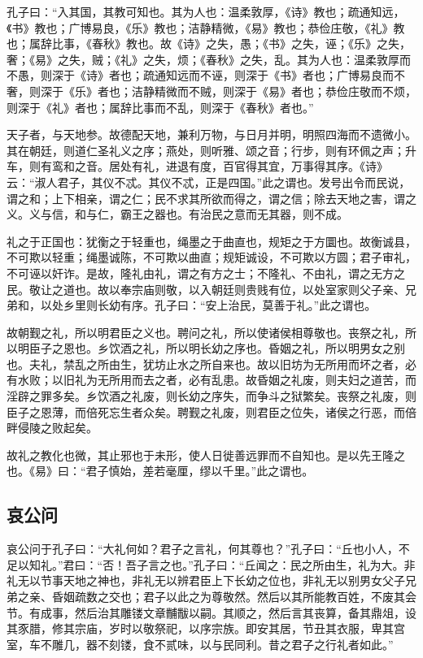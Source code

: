 \documentclass[]{article}
\begin{document}
孔子曰：``入其国，其教可知也。其为人也：温柔敦厚，《诗》教也；疏通知远，《书》教也；广博易良，《乐》教也；洁静精微，《易》教也；恭俭庄敬，《礼》教也；属辞比事，《春秋》教也。故《诗》之失，愚；《书》之失，诬；《乐》之失，奢；《易》之失，贼；《礼》之失，烦；《春秋》之失，乱。其为人也：温柔敦厚而不愚，则深于《诗》者也；疏通知远而不诬，则深于《书》者也；广博易良而不奢，则深于《乐》者也；洁静精微而不贼，则深于《易》者也；恭俭庄敬而不烦，则深于《礼》者也；属辞比事而不乱，则深于《春秋》者也。''

天子者，与天地参。故德配天地，兼利万物，与日月并明，明照四海而不遗微小。其在朝廷，则道仁圣礼义之序；燕处，则听雅、颂之音；行步，则有环佩之声；升车，则有鸾和之音。居处有礼，进退有度，百官得其宜，万事得其序。《诗》云：``淑人君子，其仪不忒。其仪不忒，正是四国。''此之谓也。发号出令而民说，谓之和；上下相亲，谓之仁；民不求其所欲而得之，谓之信；除去天地之害，谓之义。义与信，和与仁，霸王之器也。有治民之意而无其器，则不成。

礼之于正国也：犹衡之于轻重也，绳墨之于曲直也，规矩之于方圜也。故衡诚县，不可欺以轻重；绳墨诚陈，不可欺以曲直；规矩诚设，不可欺以方圆；君子审礼，不可诬以奸诈。是故，隆礼由礼，谓之有方之士；不隆礼、不由礼，谓之无方之民。敬让之道也。故以奉宗庙则敬，以入朝廷则贵贱有位，以处室家则父子亲、兄弟和，以处乡里则长幼有序。孔子曰：``安上治民，莫善于礼。''此之谓也。

故朝觐之礼，所以明君臣之义也。聘问之礼，所以使诸侯相尊敬也。丧祭之礼，所以明臣子之恩也。乡饮酒之礼，所以明长幼之序也。昏姻之礼，所以明男女之别也。夫礼，禁乱之所由生，犹坊止水之所自来也。故以旧坊为无所用而坏之者，必有水败；以旧礼为无所用而去之者，必有乱患。故昏姻之礼废，则夫妇之道苦，而淫辟之罪多矣。乡饮酒之礼废，则长幼之序失，而争斗之狱繁矣。丧祭之礼废，则臣子之恩薄，而倍死忘生者众矣。聘觐之礼废，则君臣之位失，诸侯之行恶，而倍畔侵陵之败起矣。

故礼之教化也微，其止邪也于未形，使人日徙善远罪而不自知也。是以先王隆之也。《易》曰：``君子慎始，差若毫厘，缪以千里。''此之谓也。

\hypertarget{header-n669}{%
\subsection{哀公问}\label{header-n669}}

哀公问于孔子曰：``大礼何如？君子之言礼，何其尊也？''孔子曰：``丘也小人，不足以知礼。''君曰：``否！吾子言之也。''孔子曰：``丘闻之：民之所由生，礼为大。非礼无以节事天地之神也，非礼无以辨君臣上下长幼之位也，非礼无以别男女父子兄弟之亲、昏姻疏数之交也；君子以此之为尊敬然。然后以其所能教百姓，不废其会节。有成事，然后治其雕镂文章黼黻以嗣。其顺之，然后言其丧算，备其鼎俎，设其豕腊，修其宗庙，岁时以敬祭祀，以序宗族。即安其居，节丑其衣服，卑其宫室，车不雕几，器不刻镂，食不贰味，以与民同利。昔之君子之行礼者如此。''
\end{document}
